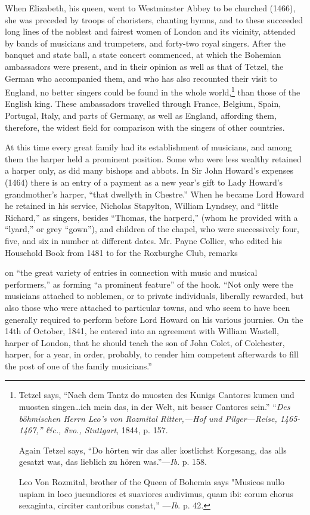 When Elizabeth, his queen, went to Westminster Abbey to be church\-ed (1466),
she was preceded by troops of choristers, chanting hymns, and to these succeeded
long lines of the noblest and fairest women of London and its vicinity, attended by
bands of musicians and trumpeters, and forty-two royal singers. After the banquet
and state ball, a state concert commenced, at which the Bohemian ambassadors
were present, and in their opinion as well as that of Tetzel, the German who accompanied
them, and who has also recounted their visit to England, no better
singers could be found in the whole world,\footnote{
Tetzel says, “Nach dem Tantz do muosten des
Kunigs Cantores kumen und muosten singen\ldots ich
mein das, in der Welt, nit besser Cantores sein.” “\textit{Des
böhmischen Herrn Leo’s von Rozmital Ritter,—Hof und
Pilger—Reise, 1465-1467,” \&c., 8vo., Stuttgart}, 1844, p. 157.

Again Tetzel says, “Do hörten wir das aller kostlichst
Korgesang, das alls gesatzt was, das lieblich zu hören
was.”—\textit{Ib}. p. 158.

Leo Von Rozmital, brother of the Queen of Bohemia
says "Musicos nullo uspiam in loco jucundiores et
suaviores audivimus, quam ibi: eorum chorus sexaginta,
circiter cantoribus constat,” —\textit{Ib}. p. 42.
} than those of the English king.
These ambassadors travelled through France, Belgium, Spain, Portugal, Italy,
and parts of Germany, as well as England, affording them, therefore, the widest
field for comparison with the singers of other countries.

At this time every great family had its establishment of musicians, and among
them the harper held a prominent position. Some who were less wealthy retained
a harper only, as did many bishops and abbots. In Sir John Howard’s expenses
(1464) there is an entry of a payment as a new year’s gift to Lady Howard’s
grandmother’s harper, “that dwellyth in Chestre.” When he became Lord
Howard he retained in his service, Nicholas Stapylton, William Lyndsey, and
“little Richard,” as singers, besides “Thomas, the harperd,” (whom he provided
with a “lyard,” or grey “gown”), and children of the chapel, who were successively
four, five, and six in number at different dates. Mr. Payne Collier, who
edited his Household Book from 1481 to  for the Roxburghe Club, remarks
on “the great variety of entries in connection with music and musical performers,”
as forming “a prominent feature” of the hook. “Not only were the musicians
attached to noblemen, or to private individuals, liberally rewarded, but also those
who were attached to particular towns, and who seem to have been generally
required to perform before Lord Howard on his various journies. On the 14th of
October, 1841, he entered into an agreement with William Wastell, harper of
London, that he should teach the son of John Colet, of Colchester, harper, for
a year, in order, probably, to render him competent afterwards to fill the post of
one of the family musicians.”

